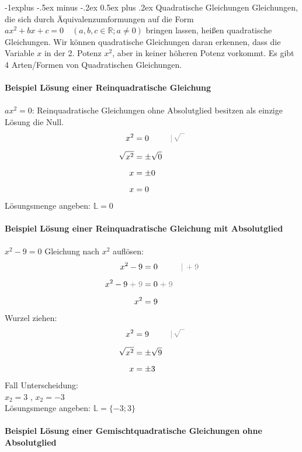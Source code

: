 \documentclass[a4paper,10pt]{article}
\makeatletter
\renewcommand{\subsection}{\@startsection{subsection}{2}{0mm}%
                                {-1explus -.5ex minus -.2ex}%
                                {0.5ex plus .2ex}%
                                {\normalfont\normalsize\bfseries}}
\makeatother
\begin{document}
\begin{multicols}{3}
    \subsection{Quadratische Gleichungen}
    Gleichungen, die sich durch Äquivalenzumformungen auf die Form $ax^2 + bx + c = 0 \quad (a, b, c \in \mathbb{R}; a \neq 0)$
    bringen lassen, heißen quadratische Gleichungen. Wir können quadratische Gleichungen daran erkennen, dass die Variable $x$ in der 2. Potenz $x^2$, aber in keiner höheren Potenz vorkommt. Es gibt 4 Arten/Formen von Quadratischen Gleichungen.\\~\\
    \textbf{Beispiel Lösung einer Reinquadratische Gleichung} \\~\\
    $ax^2 = 0$: Reinquadratische Gleichungen ohne Absolutglied besitzen als einzige Lösung die Null.
    \begin{align*} x^2 &= 0 &&{\color{gray}|\, \sqrt{\phantom{0}}} \\[5px] \sqrt{x^2} &= \pm\sqrt{0} \\[5px] x &= \pm 0 \\[5px] x &= 0 \end{align*}
    Lösungsmenge angeben:  $\mathbb{L} =  0$ \\~\\
    \textbf{Beispiel Lösung einer Reinquadratische Gleichung mit Absolutglied} \\~\\
    $x^2 - 9 = 0$ Gleichung nach $x^2$ auflösen: \\
    \begin{align*} x^2 - 9 &= 0 &&{\color{gray}|\, +9} \\[5px] x^2 - 9 {\color{gray}\;+\;9} &= 0 {\color{gray}\;+\;9} \\[5px] x^2 &= 9 \end{align*}
    Wurzel ziehen:
    \begin{align*} x^2 &= 9 &&{\color{gray}|\, \sqrt{\phantom{9}}} \\[5px] \sqrt{x^2} &= \pm\sqrt{9} \\[5px] x &= \pm 3 \end{align*}
    Fall Unterscheidung: \\
    $x_2 = 3$ , $x_2 = -3$ \\
    Lösungsmenge angeben:  $    \mathbb{L} = \{-3; 3\}$ \\~\\
    \textbf{Beispiel Lösung einer Gemischtquadratische Gleichungen ohne Absolutglied} \\~\\

\end{multicols}
\end{document}

